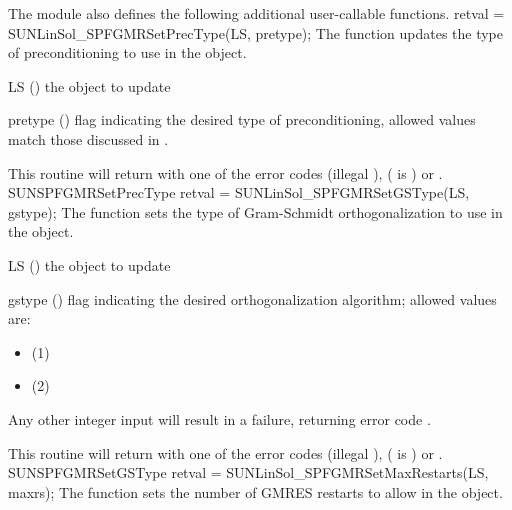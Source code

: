 The {\sunlinsolspfgmr} module also defines the following additional
user-callable functions.
%
%
{
  retval = SUNLinSol\_SPFGMRSetPrecType(LS, pretype);
}
{
  The function  updates the type of
  preconditioning to use in the {\sunlinsolspfgmr} object.
}
{
  \begin{args}[pretype]
  \item[LS] ()
    the {\sunlinsolspfgmr} object to update
  \item[pretype] ()
    flag indicating the desired type of preconditioning, allowed
    values match those discussed in .
  \end{args}
}
{
  This routine will return with one of the error codes
   (illegal ), 
  ( is ) or .
}
{}
{SUNSPFGMRSetPrecType}
%
%
{
  retval = SUNLinSol\_SPFGMRSetGSType(LS, gstype);
}
{
  The function  sets the type of
  Gram-Schmidt orthogonalization to use in the {\sunlinsolspfgmr}
  object.
}
{
  \begin{args}[gstype]
  \item[LS] ()
    the {\sunlinsolspfgmr} object to update
  \item[gstype] ()
    flag indicating the desired orthogonalization algorithm; allowed
    values are:
    \begin{itemize}
    \item {} (1)
    \item {} (2)
    \end{itemize}
    Any other integer input will result in a
    failure, returning error code \newline {}.
  \end{args}
}
{
  This routine will return with one of the error codes
   (illegal ), 
  ( is ) or .
}
{}
{SUNSPFGMRSetGSType}
%
%
{
  retval = SUNLinSol\_SPFGMRSetMaxRestarts(LS, maxrs);
}
{
  The function  sets the number of
  GMRES \newline restarts to allow in the {\sunlinsolspfgmr} object.
}
